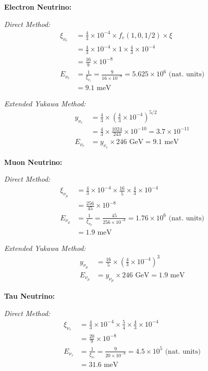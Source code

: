 \documentclass[12pt,a4paper]{article}
\begin{document}
	\textbf{Electron Neutrino:}
	
	\textit{Direct Method:}
	\begin{align}
		\xi_{\nu_e} &= \frac{4}{3} \times 10^{-4} \times f_e(1,0,1/2) \times \xi \\
		&= \frac{4}{3} \times 10^{-4} \times 1 \times \frac{4}{3} \times 10^{-4} \\
		&= \frac{16}{9} \times 10^{-8} \\
		E_{\nu_e} &= \frac{1}{\xi_{\nu_e}} = \frac{9}{16 \times 10^{-8}} = 5.625 \times 10^6 \text{ (nat. units)} \\
		&= 9.1 \text{ meV}
	\end{align}
	
	\textit{Extended Yukawa Method:}
	\begin{align}
		y_{\nu_e} &= \frac{4}{3} \times \left(\frac{4}{3} \times 10^{-4}\right)^{5/2} \\
		&= \frac{4}{3} \times \frac{1024}{243} \times 10^{-10} = 3.7 \times 10^{-11} \\
		E_{\nu_e} &= y_{\nu_e} \times 246 \text{ GeV} = 9.1 \text{ meV}
	\end{align}
	
	\textbf{Muon Neutrino:}
	
	\textit{Direct Method:}
	\begin{align}
		\xi_{\nu_\mu} &= \frac{4}{3} \times 10^{-4} \times \frac{16}{5} \times \frac{4}{3} \times 10^{-4} \\
		&= \frac{256}{45} \times 10^{-8} \\
		E_{\nu_\mu} &= \frac{1}{\xi_{\nu_\mu}} = \frac{45}{256 \times 10^{-8}} = 1.76 \times 10^6 \text{ (nat. units)} \\
		&= 1.9 \text{ meV}
	\end{align}
	
	\textit{Extended Yukawa Method:}
	\begin{align}
		y_{\nu_\mu} &= \frac{16}{5} \times \left(\frac{4}{3} \times 10^{-4}\right)^3 \\
		E_{\nu_\mu} &= y_{\nu_\mu} \times 246 \text{ GeV} = 1.9 \text{ meV}
	\end{align}
	
	\textbf{Tau Neutrino:}
	
	\textit{Direct Method:}
	\begin{align}
		\xi_{\nu_\tau} &= \frac{4}{3} \times 10^{-4} \times \frac{5}{4} \times \frac{4}{3} \times 10^{-4} \\
		&= \frac{20}{9} \times 10^{-8} \\
		E_{\nu_\tau} &= \frac{1}{\xi_{\nu_\tau}} = \frac{9}{20 \times 10^{-8}} = 4.5 \times 10^5 \text{ (nat. units)} \\
		&= 31.6 \text{ meV}
	\end{align}
	
\end{document}
